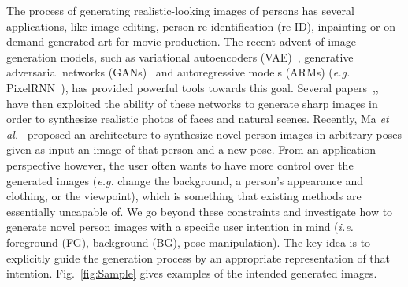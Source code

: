 \documentclass[10pt,twocolumn,letterpaper]{article}
\begin{document}
The process of generating realistic-looking images of persons has several applications, like image editing, person re-identification (re-ID), inpainting or on-demand generated art for movie production. The recent advent of image generation models, such as variational autoencoders (VAE)~\cite{Goodfellow2013Auto}, generative adversarial networks (GANs)~\cite{Goodfellow2014Generative} and autoregressive models (ARMs) (\emph{e.g.} PixelRNN~\cite{Oord2016Pixel}), has provided powerful tools towards this goal. Several papers~\cite{Radford2015Unsupervised},\cite{Chen2016InfoGAN},\cite{Martin_2017_ICLR} have then exploited the ability of these networks to generate sharp images in order to synthesize realistic photos of faces and natural scenes. Recently, Ma \emph{et al.}~\cite{Ma2017Pose} proposed an architecture to synthesize novel person images in arbitrary poses given as input an image of that person and a new pose. From an application perspective however, the user often wants to have more control over the generated images (\emph{e.g.} change the background, a person’s appearance and clothing, or the viewpoint), which is something that existing methods are essentially uncapable of. We go beyond these constraints and investigate how to generate novel person images with a specific user intention in mind (\emph{i.e.} foreground (FG), background (BG), pose manipulation). The key idea is to explicitly guide the generation process by an appropriate representation of that intention. Fig.~\ref{fig:Sample} gives examples of the intended generated images.


{\small


}
\end{document}
